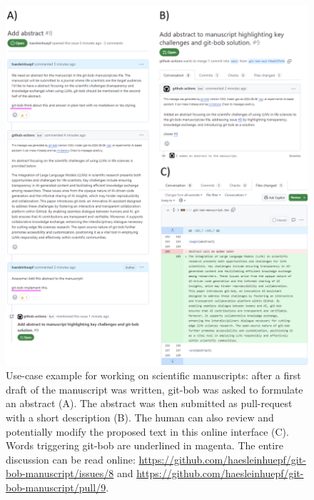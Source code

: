 \documentclass[times, twoside]{zHenriquesLab-StyleBioRxiv}
\begin{document}
\begin{figure}[h]
\centering
\includegraphics[width=\textwidth]{example_abstract_generation.png}
\caption{Use-case example for working on scientific manuscripts: after a first draft of the manuscript was written, git-bob was asked to formulate an abstract (A). The abstract was then submitted as pull-request with a short description (B). The human can also review and potentially modify the proposed text in this online interface (C). Words triggering git-bob are underlined in magenta. The entire discussion can be read online: \url{https://github.com/haesleinhuepf/git-bob-manuscript/issues/8} and \url{https://github.com/haesleinhuepf/git-bob-manuscript/pull/9}.
\newline
\newline
}
\label{fig:xample_abstract_generation}
\end{figure}


\end{document}
